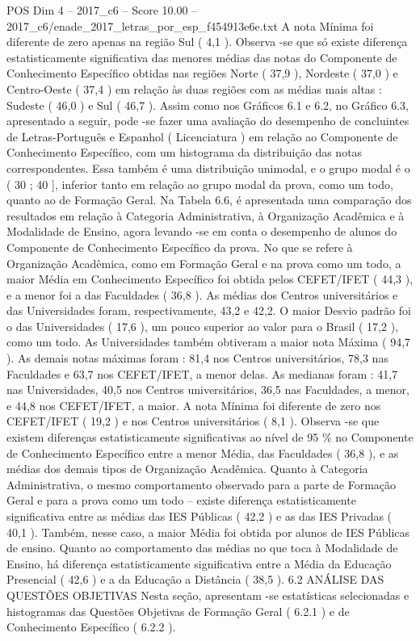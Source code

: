 \begin{textsample}{POS Dim 4 – 2017\_c6 – Score 10.00 – 2017\_c6/enade\_2017\_letras\_por\_esp\_f454913e6e.txt}
A nota Mínima foi diferente de zero apenas na região Sul ( 4,1 ).
Observa -se que só existe diferença estatisticamente significativa das menores médias das notas do Componente de Conhecimento Específico obtidas nas regiões Norte ( 37,9 ), Nordeste ( 37,0 ) e Centro-Oeste ( 37,4 ) em relação às duas regiões com as médias mais altas : Sudeste ( 46,0 ) e Sul ( 46,7 ).
Assim como nos Gráficos 6.1 e 6.2, no Gráfico 6.3, apresentado a seguir, pode -se fazer uma avaliação do desempenho de concluintes de Letras-Português e Espanhol ( Licenciatura ) em relação ao Componente de Conhecimento Específico, com um histograma da distribuição das notas correspondentes.
Essa também é uma distribuição unimodal, e o grupo modal é o ( 30 ; 40 ], inferior tanto em relação ao grupo modal da prova, como um todo, quanto ao de Formação Geral.
Na Tabela 6.6, é apresentada uma comparação dos resultados em relação à Categoria Administrativa, à Organização Acadêmica e à Modalidade de Ensino, agora levando -se em conta o desempenho de alunos do Componente de Conhecimento Específico da prova.
No que se refere à Organização Acadêmica, como em Formação Geral e na prova como um todo, a maior Média em Conhecimento Específico foi obtida pelos CEFET/IFET ( 44,3 ), e a menor foi a das Faculdades ( 36,8 ).
As médias dos Centros universitários e das Universidades foram, respectivamente, 43,2 e 42,2.
O maior Desvio padrão foi o das Universidades ( 17,6 ), um pouco superior ao valor para o Brasil ( 17,2 ), como um todo.
As Universidades também obtiveram a maior nota Máxima ( 94,7 ).
As demais notas máximas foram : 81,4 nos Centros universitários, 78,3 nas Faculdades e 63,7 nos CEFET/IFET, a menor delas.
As medianas foram : 41,7 nas Universidades, 40,5 nos Centros universitários, 36,5 nas Faculdades, a menor, e 44,8 nos CEFET/IFET, a maior.
A nota Mínima foi diferente de zero nos CEFET/IFET ( 19,2 ) e nos Centros universitários ( 8,1 ).
Observa -se que existem diferenças estatisticamente significativas ao nível de 95 \% no Componente de Conhecimento Específico entre a menor Média, das Faculdades ( 36,8 ), e as médias dos demais tipos de Organização Acadêmica.
Quanto à Categoria Administrativa, o mesmo comportamento observado para a parte de Formação Geral e para a prova como um todo – existe diferença estatisticamente significativa entre as médias das IES Públicas ( 42,2 ) e as das IES Privadas ( 40,1 ).
Também, nesse caso, a maior Média foi obtida por alunos de IES Públicas de ensino.
Quanto ao comportamento das médias no que toca à Modalidade de Ensino, há diferença estatisticamente significativa entre a Média da Educação Presencial ( 42,6 ) e a da Educação a Distância ( 38,5 ). 6.2 ANÁLISE DAS QUESTÕES OBJETIVAS Nesta seção, apresentam -se estatísticas selecionadas e histogramas das Questões Objetivas de Formação Geral ( 6.2.1 ) e de Conhecimento Específico ( 6.2.2 ).

\end{textsample}
